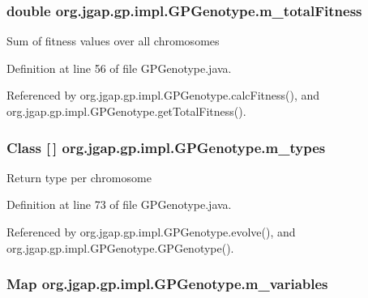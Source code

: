\hypertarget{classorg_1_1jgap_1_1gp_1_1impl_1_1_g_p_genotype_a590812317593272cd66908ef7b712a63}{
\subsubsection[{m\-\_\-total\-Fitness}]{\setlength{\rightskip}{0pt plus 5cm}double org.\-jgap.\-gp.\-impl.\-G\-P\-Genotype.\-m\-\_\-total\-Fitness\hspace{0.3cm}{\ttfamily [private]}}}\label{classorg_1_1jgap_1_1gp_1_1impl_1_1_g_p_genotype_a590812317593272cd66908ef7b712a63}
Sum of fitness values over all chromosomes 

Definition at line 56 of file G\-P\-Genotype.\-java.



Referenced by org.\-jgap.\-gp.\-impl.\-G\-P\-Genotype.\-calc\-Fitness(), and org.\-jgap.\-gp.\-impl.\-G\-P\-Genotype.\-get\-Total\-Fitness().

\hypertarget{classorg_1_1jgap_1_1gp_1_1impl_1_1_g_p_genotype_ae23e8520ee01ca7cb8f927a262db49c6}{
\subsubsection[{m\-\_\-types}]{\setlength{\rightskip}{0pt plus 5cm}Class \mbox{[}$\,$\mbox{]} org.\-jgap.\-gp.\-impl.\-G\-P\-Genotype.\-m\-\_\-types\hspace{0.3cm}{\ttfamily [private]}}}\label{classorg_1_1jgap_1_1gp_1_1impl_1_1_g_p_genotype_ae23e8520ee01ca7cb8f927a262db49c6}
Return type per chromosome 

Definition at line 73 of file G\-P\-Genotype.\-java.



Referenced by org.\-jgap.\-gp.\-impl.\-G\-P\-Genotype.\-evolve(), and org.\-jgap.\-gp.\-impl.\-G\-P\-Genotype.\-G\-P\-Genotype().

\hypertarget{classorg_1_1jgap_1_1gp_1_1impl_1_1_g_p_genotype_a03d40b9502d5bbbe9855cef68c9c8123}{
\subsubsection[{m\-\_\-variables}]{\setlength{\rightskip}{0pt plus 5cm}Map org.\-jgap.\-gp.\-impl.\-G\-P\-Genotype.\-m\-\_\-variables\hspace{0.3cm}{\ttfamily [private]}}}\label{classorg_1_1jgap_1_1gp_1_1impl_1_1_g_p_genotype_a03d40b9502d5bbbe9855cef68c9c8123}


